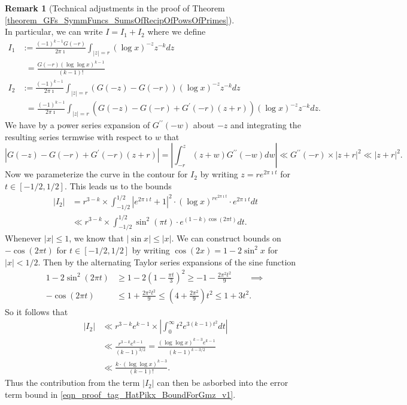 \documentclass[11pt,reqno,a4letter]{article}
\numberwithin{figure}{section}
\numberwithin{table}{section}
\theoremstyle{plain}
\numberwithin{theorem}{section}
\theoremstyle{definition}
\newtheorem{remark}[theorem]{Remark}
\begin{document}
\begin{remark}[Technical adjustments in the proof of Theorem \ref{theorem_GFs_SymmFuncs_SumsOfRecipOfPowsOfPrimes}]
\[\]
In particular, we can write $I = I_1 + I_2$ where we define 
\begin{align*} 
I_1 & := \frac{(-1)^{k-1} G(-r)}{2\pi\imath} \int_{|z|=r} (\log x)^{-z} z^{-k} dz \\ 
    & \phantom{:}= \frac{G(-r) (\log\log x)^{k-1}}{(k-1)!} \\ 
I_2 & := \frac{(-1)^{k-1}}{2\pi\imath} \int_{|z|=r} (G(-z) - G(-r)) (\log x)^{-z} z^{-k} dz \\ 
    & \phantom{:}= \frac{(-1)^{k-1}}{2\pi\imath} \int_{|z|=r} (G(-z) - G(-r) + G^{\prime}(-r) (z+r)) 
    (\log x)^{-z} z^{-k} dz. 
\end{align*} 
We have by a power series expansion of $G^{\prime\prime}(-w)$ about $-z$ and integrating 
the resulting series termwise with respect to $w$ that 
\[
\left\lvert G(-z) - G(-r) + G^{\prime}(-r) (z+r) \right\rvert = 
     \left\lvert \int_{-r}^{z} (z+w) G^{\prime\prime}(-w) dw \right\rvert \ll 
     G^{\prime\prime}(-r) \times |z+r|^2 \ll |z+r|^2. 
\] 
Now we parameterize the curve in the contour for $I_2$ by writing 
$z = re^{2\pi\imath t}$ for $t \in [-1/2, 1/2]$. This leads us to the bounds 
\begin{align*} 
|I_2| & = r^{3-k} \times \int_{-1/2}^{1/2} |e^{2\pi\imath t} + 1|^2 \cdot 
     (\log x)^{r e^{2\pi\imath t}} \cdot e^{2\pi\imath t} dt \\ 
     & \ll r^{3-k} \times \int_{-1/2}^{1/2} \sin^2(\pi t) \cdot 
     e^{(1-k) \cos(2\pi t)} dt. 
\end{align*} 
Whenever $|x| \leq 1$, we know that $|\sin x| \leq |x|$. 
We can construct bounds on $-\cos(2\pi t)$ for 
$t \in [-1/2, 1/2]$ by writing $\cos(2x) = 1 - 2\sin^2 x$ for $|x| < 1/2$. 
Then by the alternating Taylor series expansions of the sine function 
\begin{align*} 
1-2\sin^2(2\pi t) & \geq 1 - 2 \left(1 - \frac{\pi t}{3}\right)^2 \geq -1 - \frac{2\pi^2 t^2}{9} 
     \qquad \implies \\ 
-\cos(2\pi t) & \leq 1 + \frac{2\pi^2 t^2}{9} \leq \left(4 + \frac{2\pi^2}{9}\right) t^2 \leq 1 + 3t^2. 
\end{align*} 
So it follows that 
\begin{align*} 
|I_2| & \ll r^{3-k} e^{k-1} \times \left\lvert \int_0^{\infty} t^2 e^{3(k-1) t^2} dt 
     \right\rvert \\ 
     & \ll \frac{r^{3-k} e^{k-1}}{(k-1)^{3/2}} = \frac{(\log\log x)^{k-3} e^{k-1}}{(k-1)^{k-3/2}} \\ 
     & \ll \frac{k \cdot (\log\log x)^{k-3}}{(k-1)!}. 
\end{align*} 
Thus the contribution from the term $|I_2|$ can then be asborbed into the error term bound 
in \eqref{eqn_proof_tag_HatPikx_BoundForGmz_v1}. 
\end{remark} 
\end{document}
